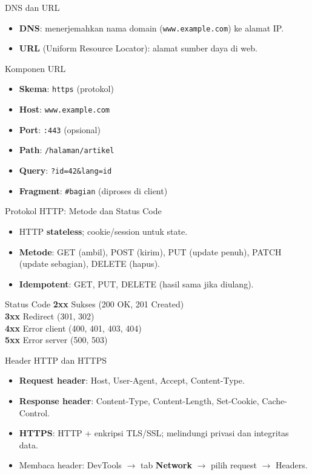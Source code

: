 \documentclass[handout]{beamer}
\begin{document}
\begin{frame}{DNS dan URL}
	\begin{itemize}
		\item \textbf{DNS}: menerjemahkan nama domain (\texttt{www.example.com}) ke alamat IP.
		\item \textbf{URL} (Uniform Resource Locator): alamat sumber daya di web.
	\end{itemize}
	\begin{block}{Komponen URL}
		\begin{itemize}
			\item \textbf{Skema}: \texttt{https} (protokol)
			\item \textbf{Host}: \texttt{www.example.com}
			\item \textbf{Port}: \texttt{:443} (opsional)
			\item \textbf{Path}: \texttt{/halaman/artikel}
			\item \textbf{Query}: \texttt{?id=42\&lang=id}
			\item \textbf{Fragment}: \texttt{\#bagian} (diproses di client)
		\end{itemize}
	\end{block}
\end{frame}

\begin{frame}{Protokol HTTP: Metode dan Status Code}
	\begin{itemize}
		\item HTTP \textbf{stateless}; cookie/session untuk state.
		\item \textbf{Metode}: GET (ambil), POST (kirim), PUT (update penuh), PATCH (update sebagian), DELETE (hapus).
		\item \textbf{Idempotent}: GET, PUT, DELETE (hasil sama jika diulang).
	\end{itemize}
	\begin{block}{Status Code}
		\textbf{2xx} Sukses (200 OK, 201 Created) \\
		\textbf{3xx} Redirect (301, 302) \\
		\textbf{4xx} Error client (400, 401, 403, 404) \\
		\textbf{5xx} Error server (500, 503)
	\end{block}
\end{frame}

\begin{frame}{Header HTTP dan HTTPS}
	\begin{itemize}
		\item \textbf{Request header}: Host, User-Agent, Accept, Content-Type.
		\item \textbf{Response header}: Content-Type, Content-Length, Set-Cookie, Cache-Control.
		\item \textbf{HTTPS}: HTTP + enkripsi TLS/SSL; melindungi privasi dan integritas data.
		\item Membaca header: DevTools $\to$ tab \textbf{Network} $\to$ pilih request $\to$ Headers.
	\end{itemize}
\end{frame}
\end{document}
